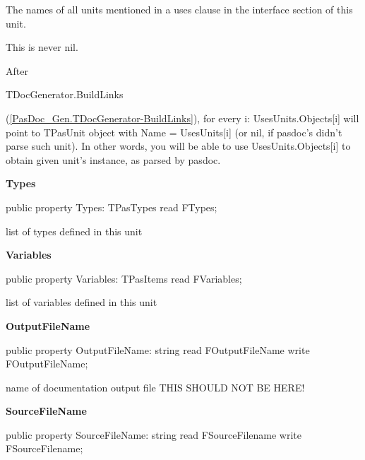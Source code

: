 \documentclass{report}
\newif\ifpdf
\begin{document}
\begin{list}{}
\begin{flushleft}
\ifpdf
\end{flushleft}
\fi


\par The names of all units mentioned in a uses clause in the interface section of this unit.

This is never nil.

After \begin{ttfamily}TDocGenerator.BuildLinks\end{ttfamily}(\ref{PasDoc_Gen.TDocGenerator-BuildLinks}), for every i: UsesUnits.Objects[i] will point to TPasUnit object with Name = UsesUnits[i] (or nil, if pasdoc's didn't parse such unit). In other words, you will be able to use UsesUnits.Objects[i] to obtain given unit's instance, as parsed by pasdoc.\label{PasDoc_Items.TPasUnit-Types}
\item[\textbf{Types}\hfill]
\ifpdf
\begin{flushleft}
\fi
\begin{ttfamily}
public property Types: TPasTypes read FTypes;\end{ttfamily}

\ifpdf
\end{flushleft}
\fi


\par list of types defined in this unit\label{PasDoc_Items.TPasUnit-Variables}
\item[\textbf{Variables}\hfill]
\ifpdf
\begin{flushleft}
\fi
\begin{ttfamily}
public property Variables: TPasItems read FVariables;\end{ttfamily}

\ifpdf
\end{flushleft}
\fi


\par list of variables defined in this unit\label{PasDoc_Items.TPasUnit-OutputFileName}
\item[\textbf{OutputFileName}\hfill]
\ifpdf
\begin{flushleft}
\fi
\begin{ttfamily}
public property OutputFileName: string read FOutputFileName write FOutputFileName;\end{ttfamily}

\ifpdf
\end{flushleft}
\fi


\par name of documentation output file THIS SHOULD NOT BE HERE!\label{PasDoc_Items.TPasUnit-SourceFileName}
\item[\textbf{SourceFileName}\hfill]
\ifpdf
\begin{flushleft}
\fi
\begin{ttfamily}
public property SourceFileName: string read FSourceFilename write FSourceFilename;\end{ttfamily}


\end{flushleft}
\end{list}
\end{document}
